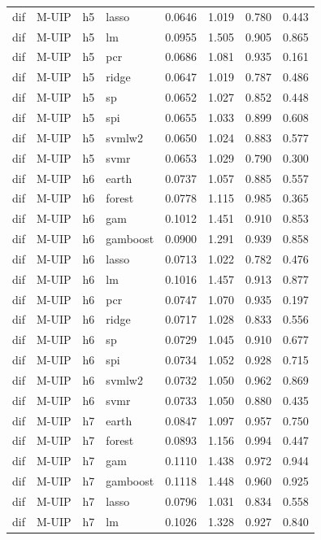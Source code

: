 \begin{ThreePartTable}
\begin{longtable}[t]{llclcccc}
dif & M-UIP & h5 & lasso & 0.0646 & 1.019 & 0.780 & 0.443\\
dif & M-UIP & h5 & lm & 0.0955 & 1.505 & 0.905 & 0.865\\
dif & M-UIP & h5 & pcr & 0.0686 & 1.081 & 0.935 & 0.161\\
dif & M-UIP & h5 & ridge & 0.0647 & 1.019 & 0.787 & 0.486\\
dif & M-UIP & h5 & sp & 0.0652 & 1.027 & 0.852 & 0.448\\
dif & M-UIP & h5 & spi & 0.0655 & 1.033 & 0.899 & 0.608\\
dif & M-UIP & h5 & svmlw2 & 0.0650 & 1.024 & 0.883 & 0.577\\
dif & M-UIP & h5 & svmr & 0.0653 & 1.029 & 0.790 & 0.300\\
\addlinespace
dif & M-UIP & h6 & earth & 0.0737 & 1.057 & 0.885 & 0.557\\
dif & M-UIP & h6 & forest & 0.0778 & 1.115 & 0.985 & 0.365\\
dif & M-UIP & h6 & gam & 0.1012 & 1.451 & 0.910 & 0.853\\
dif & M-UIP & h6 & gamboost & 0.0900 & 1.291 & 0.939 & 0.858\\
dif & M-UIP & h6 & lasso & 0.0713 & 1.022 & 0.782 & 0.476\\
dif & M-UIP & h6 & lm & 0.1016 & 1.457 & 0.913 & 0.877\\
dif & M-UIP & h6 & pcr & 0.0747 & 1.070 & 0.935 & 0.197\\
dif & M-UIP & h6 & ridge & 0.0717 & 1.028 & 0.833 & 0.556\\
dif & M-UIP & h6 & sp & 0.0729 & 1.045 & 0.910 & 0.677\\
dif & M-UIP & h6 & spi & 0.0734 & 1.052 & 0.928 & 0.715\\
dif & M-UIP & h6 & svmlw2 & 0.0732 & 1.050 & 0.962 & 0.869\\
dif & M-UIP & h6 & svmr & 0.0733 & 1.050 & 0.880 & 0.435\\
\addlinespace
dif & M-UIP & h7 & earth & 0.0847 & 1.097 & 0.957 & 0.750\\
dif & M-UIP & h7 & forest & 0.0893 & 1.156 & 0.994 & 0.447\\
dif & M-UIP & h7 & gam & 0.1110 & 1.438 & 0.972 & 0.944\\
dif & M-UIP & h7 & gamboost & 0.1118 & 1.448 & 0.960 & 0.925\\
dif & M-UIP & h7 & lasso & 0.0796 & 1.031 & 0.834 & 0.558\\
dif & M-UIP & h7 & lm & 0.1026 & 1.328 & 0.927 & 0.840\\

\end{longtable}
\end{ThreePartTable}

